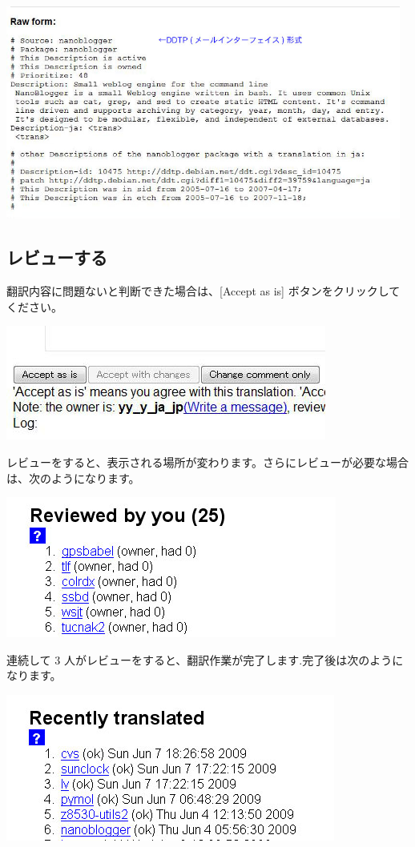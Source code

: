 \documentclass[mingoth,a4paper]{jsarticle}
\begin{document}
  \includegraphics[width=130mm]{image200906/nanoblogger104.jpg}

\subsection{レビューする}

翻訳内容に問題ないと判断できた場合は、[Accept as is] ボタンをクリックしてください。

  \includegraphics[scale=0.7]{image200906/nanoblogger112.jpg}

レビューをすると、表示される場所が変わります。さらにレビューが必要な場合
は、次のようになります。

  \includegraphics[scale=0.7]{image200906/ddtss131.jpg}

連続して 3 人がレビューをすると、翻訳作業が完了します.完了後は次のように
なります。

  \includegraphics[scale=0.7]{image200906/ddtss132.jpg}
\end{document}
